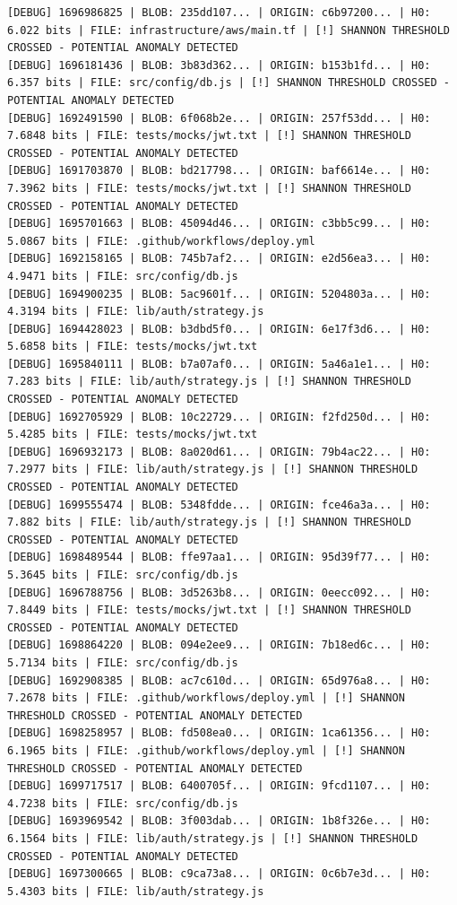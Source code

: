 \documentclass[12pt, a4paper, oneside]{report}
\begin{document}
\begin{lstlisting}[basicstyle=\tiny\ttfamily]
[DEBUG] 1696986825 | BLOB: 235dd107... | ORIGIN: c6b97200... | H0: 6.022 bits | FILE: infrastructure/aws/main.tf | [!] SHANNON THRESHOLD CROSSED - POTENTIAL ANOMALY DETECTED
[DEBUG] 1696181436 | BLOB: 3b83d362... | ORIGIN: b153b1fd... | H0: 6.357 bits | FILE: src/config/db.js | [!] SHANNON THRESHOLD CROSSED - POTENTIAL ANOMALY DETECTED
[DEBUG] 1692491590 | BLOB: 6f068b2e... | ORIGIN: 257f53dd... | H0: 7.6848 bits | FILE: tests/mocks/jwt.txt | [!] SHANNON THRESHOLD CROSSED - POTENTIAL ANOMALY DETECTED
[DEBUG] 1691703870 | BLOB: bd217798... | ORIGIN: baf6614e... | H0: 7.3962 bits | FILE: tests/mocks/jwt.txt | [!] SHANNON THRESHOLD CROSSED - POTENTIAL ANOMALY DETECTED
[DEBUG] 1695701663 | BLOB: 45094d46... | ORIGIN: c3bb5c99... | H0: 5.0867 bits | FILE: .github/workflows/deploy.yml
[DEBUG] 1692158165 | BLOB: 745b7af2... | ORIGIN: e2d56ea3... | H0: 4.9471 bits | FILE: src/config/db.js
[DEBUG] 1694900235 | BLOB: 5ac9601f... | ORIGIN: 5204803a... | H0: 4.3194 bits | FILE: lib/auth/strategy.js
[DEBUG] 1694428023 | BLOB: b3dbd5f0... | ORIGIN: 6e17f3d6... | H0: 5.6858 bits | FILE: tests/mocks/jwt.txt
[DEBUG] 1695840111 | BLOB: b7a07af0... | ORIGIN: 5a46a1e1... | H0: 7.283 bits | FILE: lib/auth/strategy.js | [!] SHANNON THRESHOLD CROSSED - POTENTIAL ANOMALY DETECTED
[DEBUG] 1692705929 | BLOB: 10c22729... | ORIGIN: f2fd250d... | H0: 5.4285 bits | FILE: tests/mocks/jwt.txt
[DEBUG] 1696932173 | BLOB: 8a020d61... | ORIGIN: 79b4ac22... | H0: 7.2977 bits | FILE: lib/auth/strategy.js | [!] SHANNON THRESHOLD CROSSED - POTENTIAL ANOMALY DETECTED
[DEBUG] 1699555474 | BLOB: 5348fdde... | ORIGIN: fce46a3a... | H0: 7.882 bits | FILE: lib/auth/strategy.js | [!] SHANNON THRESHOLD CROSSED - POTENTIAL ANOMALY DETECTED
[DEBUG] 1698489544 | BLOB: ffe97aa1... | ORIGIN: 95d39f77... | H0: 5.3645 bits | FILE: src/config/db.js
[DEBUG] 1696788756 | BLOB: 3d5263b8... | ORIGIN: 0eecc092... | H0: 7.8449 bits | FILE: tests/mocks/jwt.txt | [!] SHANNON THRESHOLD CROSSED - POTENTIAL ANOMALY DETECTED
[DEBUG] 1698864220 | BLOB: 094e2ee9... | ORIGIN: 7b18ed6c... | H0: 5.7134 bits | FILE: src/config/db.js
[DEBUG] 1692908385 | BLOB: ac7c610d... | ORIGIN: 65d976a8... | H0: 7.2678 bits | FILE: .github/workflows/deploy.yml | [!] SHANNON THRESHOLD CROSSED - POTENTIAL ANOMALY DETECTED
[DEBUG] 1698258957 | BLOB: fd508ea0... | ORIGIN: 1ca61356... | H0: 6.1965 bits | FILE: .github/workflows/deploy.yml | [!] SHANNON THRESHOLD CROSSED - POTENTIAL ANOMALY DETECTED
[DEBUG] 1699717517 | BLOB: 6400705f... | ORIGIN: 9fcd1107... | H0: 4.7238 bits | FILE: src/config/db.js
[DEBUG] 1693969542 | BLOB: 3f003dab... | ORIGIN: 1b8f326e... | H0: 6.1564 bits | FILE: lib/auth/strategy.js | [!] SHANNON THRESHOLD CROSSED - POTENTIAL ANOMALY DETECTED
[DEBUG] 1697300665 | BLOB: c9ca73a8... | ORIGIN: 0c6b7e3d... | H0: 5.4303 bits | FILE: lib/auth/strategy.js
\end{lstlisting}
\end{document}
